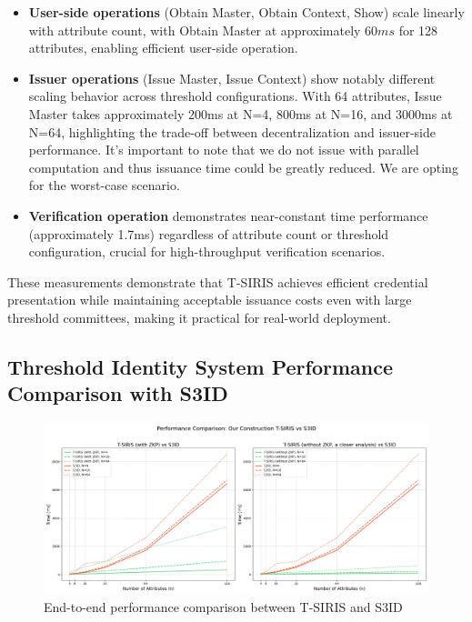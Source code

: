 \begin{itemize}
    \item \textbf{User-side operations} (Obtain Master, Obtain Context, Show) scale linearly with attribute count, with Obtain Master at approximately $60ms$ for 128 attributes, enabling efficient user-side operation.
        
    \item \textbf{Issuer operations} (Issue Master, Issue Context) show notably different scaling behavior across threshold configurations. With 64 attributes, Issue Master takes approximately 200ms at N=4, 800ms at N=16, and 3000ms at N=64, highlighting the trade-off between decentralization and issuer-side performance. It's important to note that we do not issue with parallel computation and thus issuance time could be greatly reduced. We are opting for the worst-case scenario.
    
    \item \textbf{Verification operation} demonstrates near-constant time performance (approximately 1.7ms) regardless of attribute count or threshold configuration, crucial for high-throughput verification scenarios.

\end{itemize}

These measurements demonstrate that T-SIRIS achieves efficient credential presentation while maintaining acceptable issuance costs even with large threshold committees, making it practical for real-world deployment.


\subsection{Threshold Identity System Performance Comparison with S3ID}
 

\begin{figure}[!htb]
    \centering
    \includegraphics[width=\linewidth]{figures/chap5_tsiris_against_s3id.png}
    \caption{End-to-end performance comparison between T-SIRIS and S3ID}
    \label{fig:tsiris-vs-s3id}
\end{figure}


